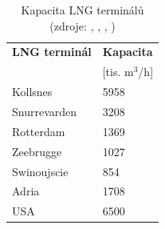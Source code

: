 \documentclass[a4paper,12pt]{article}
\begin{document}
  \begin{table}[h!]
  \centering
  \begin{tabular}{| l | l |}
    \hline
    \textbf{LNG terminál} & \textbf{Kapacita}  \\
     & [tis. m$^3$/h] \\
    \hline\hline
    Kollsnes & 5958 \\ \hline
    Snurrevarden & 3208 \\ \hline
    Rotterdam & 1369  \\ \hline
    Zeebrugge & 1027 \\ \hline
    Swinoujscie & 854 \\ \hline
    Adria & 1708 \\ \hline
    USA & 6500 \\
    \hline
  \end{tabular}
  \caption{Kapacita LNG terminálů (zdroje: \cite{prouza}, \cite{usa}, \cite{rotterdam}, \cite{zeebrugge})}
  \label{tab3}
  \end{table}
  
\end{document}
